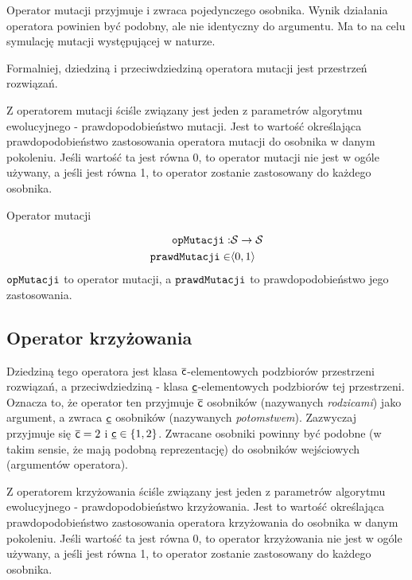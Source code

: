 \documentclass[./FM_mgr.tex]{subfiles}
\begin{document}
Operator mutacji przyjmuje i zwraca pojedynczego osobnika.
Wynik działania operatora powinien być podobny, ale nie identyczny do argumentu.
Ma to na celu symulację mutacji występującej w naturze.

Formalniej, dziedziną i przeciwdziedziną operatora mutacji jest przestrzeń rozwiązań.

Z operatorem mutacji ściśle związany jest jeden z parametrów algorytmu ewolucyjnego - prawdopodobieństwo mutacji. 
Jest to wartość określająca prawdopodobieństwo zastosowania operatora mutacji do osobnika w danym pokoleniu. 
Jeśli wartość ta jest równa 0, to operator mutacji nie jest w ogóle używany, a jeśli jest równa 1, to operator zostanie zastosowany do każdego osobnika.

\begin{signature}
	\caption{Operator mutacji \label{signature:mutation}}
	\begin{align}
		\mathtt{opMutacji}: & \mathcal{S} \rightarrow \mathcal{S} \\
		\mathtt{prawdMutacji} \in & \langle0, 1\rangle
	\end{align}
	$\mathtt{opMutacji}$ to operator mutacji, a $\mathtt{prawdMutacji}$ to prawdopodobieństwo jego zastosowania.
\end{signature}	

\subsection{Operator krzyżowania} \label{subsection:crossover}

Dziedziną tego operatora jest klasa $\mathsf{\overline{c}}$-elementowych podzbiorów przestrzeni rozwiązań, a przeciwdziedziną - klasa $\mathsf{\underline{c}}$-elementowych podzbiorów tej przestrzeni. 
Oznacza to, że operator ten przyjmuje $\mathsf{\overline{c}}$ osobników (nazywanych \emph{rodzicami}) jako argument, a zwraca $\mathsf{\underline{c}}$ osobników (nazywanych \emph{potomstwem}). 
Zazwyczaj przyjmuje się $ \mathsf{\overline{c}} = 2 $ i $\mathsf{\underline{c}} \in \left\{1, 2 \right\}$. 
Zwracane osobniki powinny być podobne (w takim sensie, że mają podobną reprezentację) do osobników wejściowych (argumentów operatora). 

Z operatorem krzyżowania ściśle związany jest jeden z parametrów algorytmu ewolucyjnego - prawdopodobieństwo krzyżowania. Jest to wartość określająca prawdopodobieństwo zastosowania operatora krzyżowania do osobnika w danym pokoleniu. Jeśli wartość ta jest równa 0, to operator krzyżowania nie jest w ogóle używany, a jeśli jest równa 1, to operator zostanie zastosowany do każdego osobnika.
\end{document}
